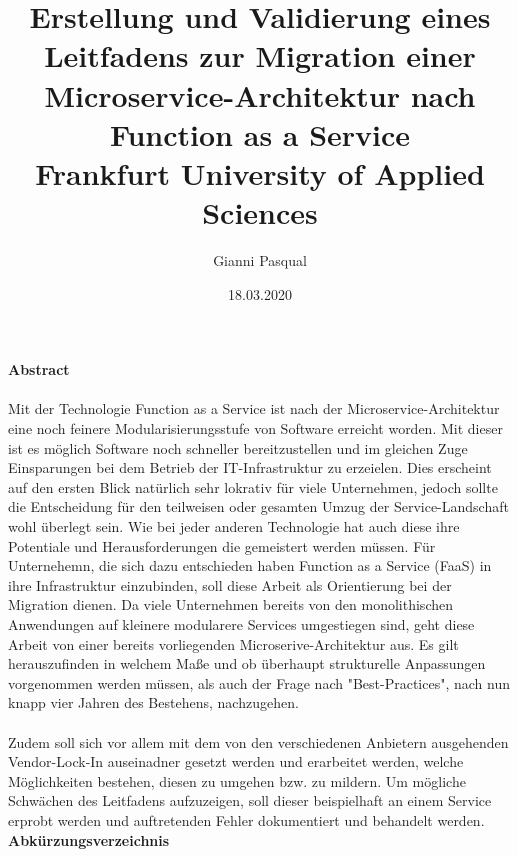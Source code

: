 \documentclass[11pt]{article}
\title{
{Erstellung und Validierung eines Leitfadens zur Migration einer Microservice-Architektur nach Function as a Service}\\
{\large Frankfurt University of Applied Sciences}\\
}
\author{Gianni Pasqual}
\date{18.03.2020}
\begin{document}
\maketitle
\newpage
{\Large \textbf {Abstract}}
\\\\
Mit der Technologie Function as a Service ist nach der Microservice-Architektur eine noch feinere Modularisierungsstufe von Software erreicht worden. Mit dieser ist es möglich Software noch schneller bereitzustellen und im gleichen Zuge Einsparungen bei dem Betrieb der IT-Infrastruktur zu erzeielen. Dies erscheint auf den ersten Blick natürlich sehr lokrativ für viele Unternehmen, jedoch sollte die Entscheidung für den teilweisen oder gesamten Umzug der Service-Landschaft wohl überlegt sein. Wie bei jeder anderen Technologie hat auch diese ihre Potentiale und Herausforderungen die gemeistert werden müssen. Für Unternehemn, die sich dazu entschieden haben Function as a Service (FaaS) in ihre Infrastruktur einzubinden, soll diese Arbeit als Orientierung bei der Migration dienen. Da viele Unternehmen bereits von den monolithischen Anwendungen auf kleinere modularere Services umgestiegen sind, geht diese Arbeit von einer bereits vorliegenden Microserive-Architektur aus. Es gilt herauszufinden in welchem Maße und ob überhaupt strukturelle Anpassungen vorgenommen werden müssen, als auch der Frage nach "Best-Practices", nach nun knapp vier Jahren des Bestehens, nachzugehen.
\\\\
Zudem soll sich vor allem mit dem von den verschiedenen Anbietern ausgehenden Vendor-Lock-In auseinadner gesetzt werden und erarbeitet werden, welche Möglichkeiten bestehen, diesen zu umgehen bzw. zu mildern. Um mögliche Schwächen des Leitfadens aufzuzeigen, soll dieser beispielhaft an einem Service erprobt werden und auftretenden Fehler dokumentiert und behandelt werden.
\newpage
{\Large \textbf {Abkürzungsverzeichnis}}
\\\\\\
\end{document}
